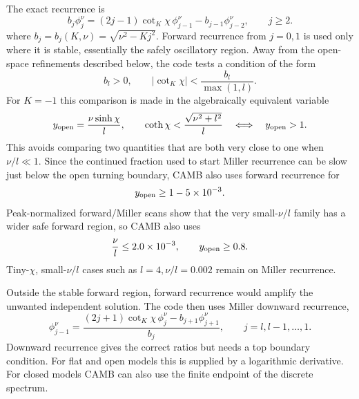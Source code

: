 \documentclass[11pt,a4paper]{article}
\newcommand{\cotK}{\cot_K}
\newcommand{\abs}[1]{\left|#1\right|}
\begin{document}
The exact recurrence is
\begin{equation}
  b_j\phi_j^\nu
  =(2j-1)\cotK\chi\,\phi_{j-1}^\nu
  -b_{j-1}\phi_{j-2}^\nu,
  \qquad j\ge2.
  \label{eq:up-recurrence}
\end{equation}
where \(b_j=b_j(K,\nu)=\sqrt{\nu^2-Kj^2}\).
Forward recurrence from \(j=0,1\) is used only where it is stable, essentially the safely oscillatory region.  Away from the open-space refinements described below, the code tests a condition of the form
\begin{equation}
  b_l>0,\qquad \abs{\cotK\chi}<\frac{b_l}{\max(1,l)}.
\end{equation}
For \(K=-1\) this comparison is made in the algebraically equivalent variable
\begin{equation}
  y_{\rm open}=\frac{\nu\sinh\chi}{l},
  \qquad
  \coth\chi<\frac{\sqrt{\nu^2+l^2}}{l}
  \quad\Longleftrightarrow\quad
  y_{\rm open}>1.
  \label{eq:open-recurrence-turning-ratio}
\end{equation}
This avoids comparing two quantities that are both very close to one when
\(\nu/l\ll1\).  Since the continued fraction used to start Miller recurrence
can be slow just below the open turning boundary, CAMB also uses forward
recurrence for
\begin{equation}
  y_{\rm open}\ge 1-5\times10^{-3}.
  \label{eq:open-recurrence-boundary-layer}
\end{equation}
Peak-normalized forward/Miller scans show that the very small-\(\nu/l\) family
has a wider safe forward region, so CAMB also uses
\begin{equation}
  \frac{\nu}{l}\le2.0\times10^{-3},
  \qquad
  y_{\rm open}\ge0.8.
  \label{eq:open-recurrence-low-beta}
\end{equation}
Tiny-\(\chi\), small-\(\nu/l\) cases such as \(l=4,\nu/l=0.002\) remain on
Miller recurrence.

Outside the stable forward region, forward recurrence would amplify the unwanted independent solution.  The code then uses Miller downward recurrence,
\begin{equation}
  \phi_{j-1}^\nu
  =\frac{(2j+1)\cotK\chi\,\phi_j^\nu-b_{j+1}\phi_{j+1}^\nu}{b_j},
  \qquad j=l,l-1,\ldots,1.
  \label{eq:down-recurrence}
\end{equation}
Downward recurrence gives the correct ratios but needs a top boundary condition.  For flat and open models this is supplied by a logarithmic derivative.  For closed models CAMB can also use the finite endpoint of the discrete spectrum.
\end{document}
